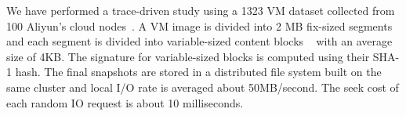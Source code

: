 
We have performed a trace-driven study using  a 1323 VM dataset  collected from 100 Aliyun's cloud nodes~\cite{WeiZhangIEEE}.
%
A VM image is  divided into 2 MB fix-sized segments and each segment is divided into 
variable-sized content blocks ~\cite{similar94} with an average size of 4KB.
The signature for variable-sized blocks is computed using their SHA-1 hash. 
The final snapshots are stored in a distributed file system built on the same cluster and local I/O rate
is averaged about 50MB/second.  The seek cost of each random IO request is about  10 milliseconds.




